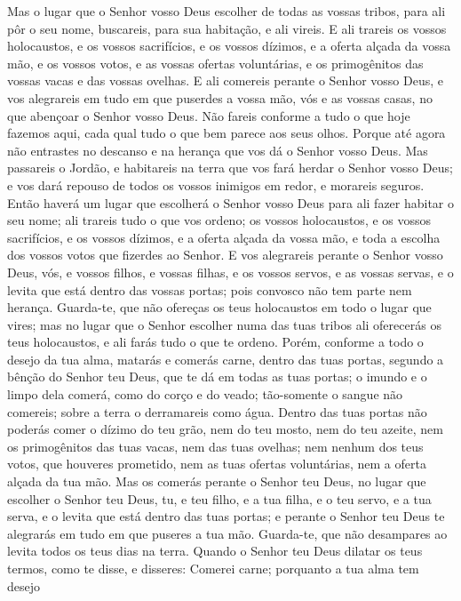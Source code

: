 Mas o lugar que o Senhor vosso Deus escolher de todas as vossas
tribos, para ali pôr o seu nome, buscareis, para sua habitação, e
ali vireis. E ali trareis os vossos holocaustos, e os vossos
sacrifícios, e os vossos dízimos, e a oferta alçada da vossa mão, e
os vossos votos, e as vossas ofertas voluntárias, e os primogênitos
das vossas vacas e das vossas ovelhas. E ali comereis perante o
Senhor vosso Deus, e vos alegrareis em tudo em que puserdes a vossa
mão, vós e as vossas casas, no que abençoar o Senhor vosso Deus.
Não fareis conforme a tudo o que hoje fazemos aqui, cada qual
tudo o que bem parece aos seus olhos. Porque até agora não
entrastes no descanso e na herança que vos dá o Senhor vosso Deus.
Mas passareis o Jordão, e habitareis na terra que vos fará
herdar o Senhor vosso Deus; e vos dará repouso de todos os vossos
inimigos em redor, e morareis seguros. Então haverá um lugar
que escolherá o Senhor vosso Deus para ali fazer habitar o seu nome;
ali trareis tudo o que vos ordeno; os vossos holocaustos, e os
vossos sacrifícios, e os vossos dízimos, e a oferta alçada da vossa
mão, e toda a escolha dos vossos votos que fizerdes ao Senhor.
E vos alegrareis perante o Senhor vosso Deus, vós, e vossos
filhos, e vossas filhas, e os vossos servos, e as vossas servas, e o
levita que está dentro das vossas portas; pois convosco não tem
parte nem herança. Guarda-te, que não ofereças os teus
holocaustos em todo o lugar que vires; mas no lugar que o
Senhor escolher numa das tuas tribos ali oferecerás os teus
holocaustos, e ali farás tudo o que te ordeno. Porém,
conforme a todo o desejo da tua alma, matarás e comerás carne,
dentro das tuas portas, segundo a bênção do Senhor teu Deus, que te
dá em todas as tuas portas; o imundo e o limpo dela comerá, como do
corço e do veado; tão-somente o sangue não comereis; sobre a
terra o derramareis como água. Dentro das tuas portas não
poderás comer o dízimo do teu grão, nem do teu mosto, nem do teu
azeite, nem os primogênitos das tuas vacas, nem das tuas ovelhas;
nem nenhum dos teus votos, que houveres prometido, nem as tuas
ofertas voluntárias, nem a oferta alçada da tua mão. Mas os
comerás perante o Senhor teu Deus, no lugar que escolher o Senhor
teu Deus, tu, e teu filho, e a tua filha, e o teu servo, e a tua
serva, e o levita que está dentro das tuas portas; e perante o
Senhor teu Deus te alegrarás em tudo em que puseres a tua mão.
Guarda-te, que não desampares ao levita todos os teus dias na
terra. Quando o Senhor teu Deus dilatar os teus termos, como
te disse, e disseres: Comerei carne; porquanto a tua alma tem desejo
